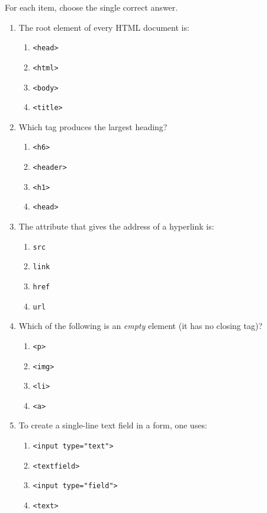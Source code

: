 \documentclass[11pt]{article}
\begin{document}
\begin{exercice}
For each item, choose the single correct answer.
\begin{enumerate}
\item The root element of every HTML document is:
\begin{enumerate}
\item \texttt{<head>}
\item \texttt{<html>}
\item \texttt{<body>}
\item \texttt{<title>}
\end{enumerate}
\item Which tag produces the largest heading?
\begin{enumerate}
\item \texttt{<h6>}
\item \texttt{<header>}
\item \texttt{<h1>}
\item \texttt{<head>}
\end{enumerate}
\item The attribute that gives the address of a hyperlink is:
\begin{enumerate}
\item \texttt{src}
\item \texttt{link}
\item \texttt{href}
\item \texttt{url}
\end{enumerate}
\item Which of the following is an \emph{empty} element (it has no closing tag)?
\begin{enumerate}
\item \texttt{<p>}
\item \texttt{<img>}
\item \texttt{<li>}
\item \texttt{<a>}
\end{enumerate}
\item To create a single-line text field in a form, one uses:
\begin{enumerate}
\item \texttt{<input type="text">}
\item \texttt{<textfield>}
\item \texttt{<input type="field">}
\item \texttt{<text>}
\end{enumerate}
\end{enumerate}
\end{exercice}
\end{document}
